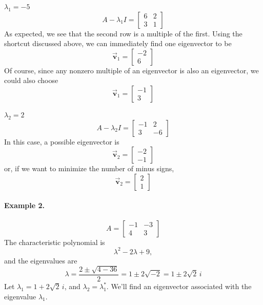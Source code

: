 \documentclass{book}
\newcommand{\BV}{\vec{\textbf{v}}}
\begin{document}
\medskip
\noindent
\underline{$\lambda_1 = -5$}
\[
   A-\lambda_1 I = \begin{bmatrix}
                   6 & 2 \\ 3 & 1
                   \end{bmatrix}
\]
As expected, we see that the second row
is a multiple of the first. Using the shortcut discussed
above, we can immediately find one eigenvector to be
\[
   \BV_1 = \begin{bmatrix} -2 \\ 6 \end{bmatrix}
\]
Of course, since any nonzero multiple of an eigenvector
is also an eigenvector, we could also choose
\[
   \BV_1 = \begin{bmatrix} -1 \\ 3 \end{bmatrix}
\]

\medskip
\noindent
\underline{$\lambda_2 = 2$}
\[
  A - \lambda_2 I = \begin{bmatrix}
                      -1 & 2 \\ 3 & -6
                    \end{bmatrix}
\]
In this case, a possible eigenvector is
\[
  \BV_2 = \begin{bmatrix} -2 \\ -1 \end{bmatrix}
\]
or, if we want to minimize the number of minus signs,
\[
  \BV_2 = \begin{bmatrix} 2 \\ 1 \end{bmatrix}
\]

\paragraph{Example 2.}
\[
   A = \begin{bmatrix} -1 & -3 \\ 4 & 3 \end{bmatrix}
\]
The characteristic polynomial is
\[
  \lambda^2 - 2\lambda + 9,
\]
and the eigenvalues are
\[
  \lambda = \frac{2\pm \sqrt{4-36}}{2} = 1\pm 2\sqrt{-2}
    = 1 \pm 2 \sqrt{2} \, i
\]
Let $\lambda_1 = 1 + 2\sqrt{2}\, i$, and $\lambda_2 = \lambda_1^{*}$.
We'll find an eigenvector associated with
the eigenvalue $\lambda_1$.
\end{document}
